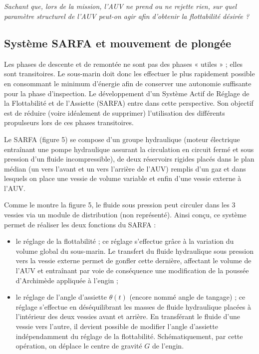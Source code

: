 \documentclass[11pt,oneside]{article}
\begin{document}
\subparagraph{}
\textit{Sachant que, lors de la mission, l’AUV ne prend ou ne rejette rien, sur quel paramètre structurel de l’AUV peut-on agir afin d’obtenir la flottabilité désirée ?}



\subsection{Système SARFA et mouvement de plongée}
{
Les phases de descente et de remontée ne sont pas des phases « utiles » ; elles sont transitoires. Le sous-marin doit donc les effectuer le plus rapidement possible en consommant le minimum d’énergie afin de conserver une autonomie suffisante pour la phase d’inspection. Le développement d’un Système Actif de Réglage de la Flottabilité et de l’Assiette (SARFA) entre dans cette perspective. Son objectif est de réduire (voire idéalement de supprimer) l’utilisation des différents propulseurs lors de ces phases transitoires.

Le SARFA (figure 5) se compose d’un groupe hydraulique (moteur électrique entraînant une pompe hydraulique assurant la circulation en circuit fermé et sous pression d’un fluide incompressible), de deux réservoirs rigides placés dans le plan médian (un vers l’avant et un vers l’arrière de l’AUV) remplis d’un gaz et dans lesquels on place une vessie de volume variable et enfin d’une vessie externe à l’AUV.

Comme le montre la figure 5, le fluide sous pression peut circuler dans les 3 vessies via un module de distribution (non représenté). Ainsi conçu, ce système permet de réaliser les deux fonctions du SARFA :
\begin{itemize}
\item le réglage de la flottabilité ; ce réglage s’effectue grâce à la variation du volume global du sous-marin. Le transfert du fluide hydraulique sous pression vers la vessie externe permet de gonfler cette dernière, affectant le volume de l’AUV et entraînant par voie de conséquence une modification de la poussée d’Archimède appliquée à l’engin ;
\item le réglage de l’angle d’assiette $\theta(t)$ (encore nommé angle de tangage) ; ce réglage s’effectue en déséquilibrant les masses de fluide hydraulique placées à l’intérieur des deux vessies avant et arrière. En transférant le fluide d’une vessie vers l’autre, il devient possible de modifier l’angle d’assiette indépendamment du réglage de la flottabilité. Schématiquement, par cette opération, on déplace le centre de gravité $G$ de l’engin.
\end{itemize}


}
\end{document}

